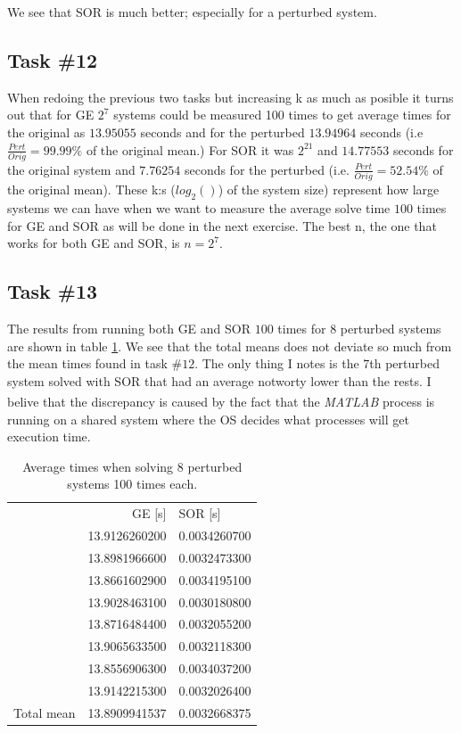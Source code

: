 \documentclass[10pt, a4paper]{article}
\newcommand{\matlab}{\small{\emph{MATLAB\textsuperscript{\textregistered}}}}
\begin{document}
We see that SOR is much better; especially for a perturbed system.

\subsection{Task \#12}
When redoing the previous two tasks but increasing k as much as posible it turns out that for GE $2^7$ systems could be measured 100 times to get average times for the original as $13.95055$ seconds and for the perturbed $13.94964$ seconds (i.e $\frac{Pert}{Orig}=99.99\%$ of the original mean.) For SOR it was $2^{21}$ and $14.77553$ seconds for the original system and $7.76254$ seconds for the perturbed (i.e. $\frac{Pert}{Orig}=52.54\%$ of the original mean). These k:s ($log_2()$) of the system size) represent how large systems we can have when we want to measure the average solve time $100$ times for GE and SOR as will be done in the next exercise. The best n, the one that works for both GE and SOR, is $n=2^7$.

\subsection{Task \#13}
The results from running both GE and SOR $100$ times for $8$ perturbed systems are shown in table \ref{table+avgpert}. We see that the total means does not deviate so much from the mean times found in task $\#12$. The only thing I notes is the 7th perturbed system solved with SOR that had an average notworty lower than the rests. I belive that the discrepancy is caused by the fact that the \matlab{} process is running on a shared system where the OS decides what processes will get execution time.

\begin{table}[h]
\begin{center}
\begin{tabular}{l l | l}
\multicolumn{2}{r}{GE [s]} & SOR [s]  \\ \cline{2-3}
		& 13.9126260200 & 0.0034260700 \\
		& 13.8981966600 & 0.0032473300 \\
		& 13.8661602900 & 0.0034195100 \\
		& 13.9028463100 & 0.0030180800 \\
		& 13.8716484400 & 0.0032055200 \\
		& 13.9065633500 & 0.0032118300 \\
		& 13.8556906300 & 0.0034037200 \\
		& 13.9142215300 & 0.0032026400 \\ \cline{2-3}
Total mean	& 13.8909941537 & 0.0032668375
\end{tabular}
\caption{Average times when solving 8 perturbed systems 100 times each.}
\end{center}
\label{table+avgpert}
\end{table}
\end{document}
